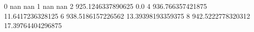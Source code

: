 0 nan nan
1 nan nan
2 925.1246337890625 0.0
4 936.766357421875 11.6417236328125
6 938.5186157226562 13.39398193359375
8 942.5222778320312 17.39764404296875
